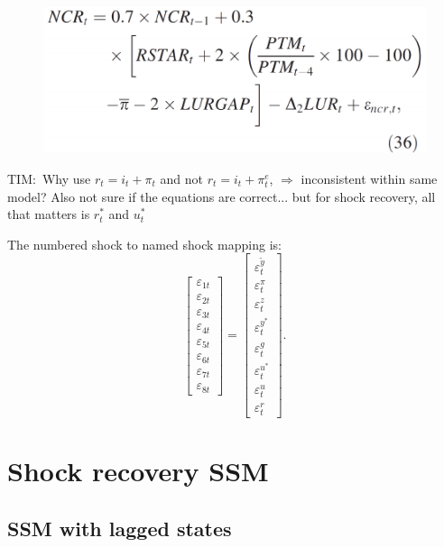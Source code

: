 \documentclass[a4paper,12pt]{article}
\begin{document}
\begin{figure}[h]
\centering
\includegraphics[width=.5\textwidth]{S34R0D00__1}
\end{figure}

\noindent TIM:\ Why use $r_{t}=i_{t}+\pi _{t}$ and not $r_{t}=i_{t}+\pi
_{t}^{e}$, $\Rightarrow $ inconsistent within same model? Also not sure if
the equations are correct... but for shock recovery, all that matters is $%
r_{t}^{\ast }$ and $u_{t}^{\ast }$

The numbered shock to named shock mapping is:
\begin{equation}
\begin{bmatrix}
\varepsilon _{1t} \\
\varepsilon _{2t} \\
\varepsilon _{3t} \\
\varepsilon _{4t} \\
\varepsilon _{5t} \\
\varepsilon _{6t} \\
\varepsilon _{7t} \\
\varepsilon _{8t}%
\end{bmatrix}%
=%
\begin{bmatrix}
\varepsilon _{t}^{\tilde{y}} \\
\varepsilon _{t}^{\pi } \\
\varepsilon _{t}^{z} \\
\varepsilon _{t}^{y^{\ast }} \\
\varepsilon _{t}^{g} \\
\varepsilon _{t}^{u^{\ast }} \\
\varepsilon _{t}^{u} \\
\varepsilon _{t}^{r}%
\end{bmatrix}%
.
\end{equation}

\section{Shock recovery SSM}

\subsection{SSM with lagged states}
\end{document}
